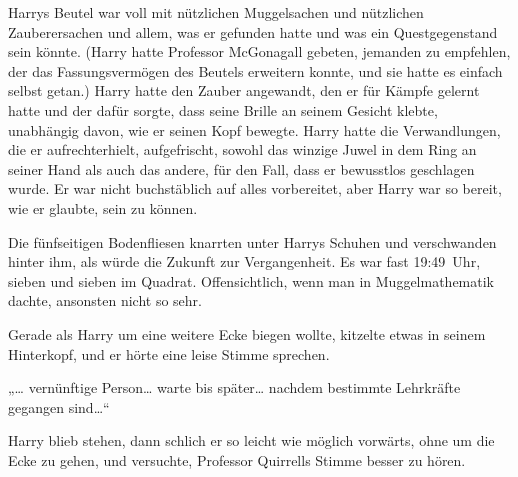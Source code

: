 Harrys Beutel war voll mit nützlichen Muggelsachen und nützlichen Zauberersachen und allem, was er gefunden hatte und was ein Questgegenstand sein könnte.
(Harry hatte Professor McGonagall gebeten, jemanden zu empfehlen, der das Fassungsvermögen des Beutels erweitern konnte, und sie hatte es einfach selbst getan.)
Harry hatte den Zauber angewandt, den er für Kämpfe gelernt hatte und der dafür sorgte, dass seine Brille an seinem Gesicht klebte, unabhängig davon, wie er seinen Kopf bewegte. Harry hatte die Verwandlungen, die er aufrechterhielt, aufgefrischt, sowohl das winzige Juwel in dem Ring an seiner Hand als auch das andere, für den Fall, dass er bewusstlos geschlagen wurde. Er war nicht buchstäblich auf alles vorbereitet, aber Harry war so bereit, wie er glaubte, sein zu können.

Die fünfseitigen Bodenfliesen knarrten unter Harrys Schuhen und verschwanden hinter ihm, als würde die Zukunft zur Vergangenheit.
Es war fast 19:49~Uhr, sieben und sieben im Quadrat. Offensichtlich, wenn man in Muggelmathematik dachte, ansonsten nicht so sehr.

Gerade als Harry um eine weitere Ecke biegen wollte, kitzelte etwas in seinem Hinterkopf, und er hörte eine leise Stimme sprechen.

„… vernünftige Person… warte bis später… nachdem bestimmte Lehrkräfte gegangen sind…“

Harry blieb stehen, dann schlich er so leicht wie möglich vorwärts, ohne um die Ecke zu gehen, und versuchte, Professor Quirrells Stimme besser zu hören.

